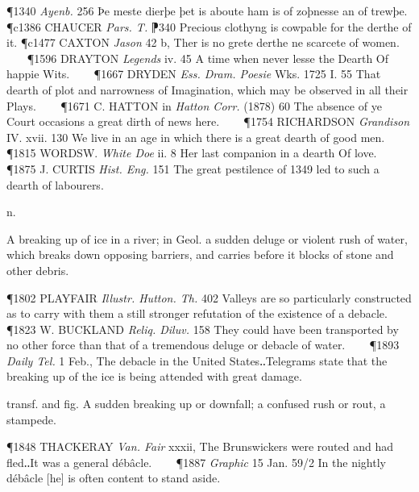 \begin{description}[wide, labelwidth=!, labelindent=0pt]
\begin{myenumerate}
\P 1340  \textit{Ayenb.} 256 Þe meste dierþe þet is aboute ham is of zoþnesse an of trewþe.
\P c1386 CHAUCER  \textit{Pars. T.} ⁋340 Precious clothyng is cowpable for the derthe of it.
\P c1477 CAXTON  \textit{Jason} 42 b, Ther is no grete derthe ne scarcete of women.    
\P 1596 DRAYTON  \textit{Legends} iv. 45 A time when never lesse the Dearth Of happie Wits.    
\P 1667 DRYDEN  \textit{Ess. Dram. Poesie} Wks. 1725 I. 55 That dearth of plot and narrowness of Imagination, which may be observed in all their Plays.    
\P 1671 C. HATTON in  \textit{Hatton Corr.} (1878) 60 The absence of ye Court occasions a great dirth of news here.    
\P 1754 RICHARDSON  \textit{Grandison} IV. xvii. 130 We live in an age in which there is a great dearth of good men.    
\P 1815 WORDSW.  \textit{White Doe} ii. 8 Her last companion in a dearth Of love.    
\P 1875 J. CURTIS  \textit{Hist. Eng.} 151 The great pestilence of 1349 led  to such a dearth of labourers.
\end{myenumerate}


 n.

\noindent {}

\noindent [a. F. débâcle, vbl. n. from débâcler to unbar, remove a bar, f. dé- = des- (see de- I. 6) + bâcler to bar.]
\vspace{-0.3cm}

\begin{myenumerate}

 A breaking up of ice in a river; in Geol. a sudden deluge or violent rush of water, which breaks down opposing barriers, and carries before it blocks of stone and other debris.

\P 1802 PLAYFAIR  \textit{Illustr. Hutton. Th.} 402 Valleys are so particularly constructed as to carry with them a still stronger refutation of the existence of a debacle.    
\P 1823 W. BUCKLAND  \textit{Reliq. Diluv.} 158 They could have been transported by no other force than that of a tremendous deluge or debacle of water.    
\P 1893  \textit{Daily Tel.} 1 Feb., The debacle in the United States‥Telegrams state that the breaking up of the ice is being attended with great damage.

 transf. and fig. A sudden breaking up or downfall; a confused rush or rout, a stampede.

\P 1848 THACKERAY  \textit{Van. Fair} xxxii, The Brunswickers were routed and had fled‥It was a general débâcle.    
\P 1887 \textit{Graphic}  15 Jan. 59/2 In the nightly débâcle [he] is often content to stand aside.
\end{myenumerate}



\end{description}
